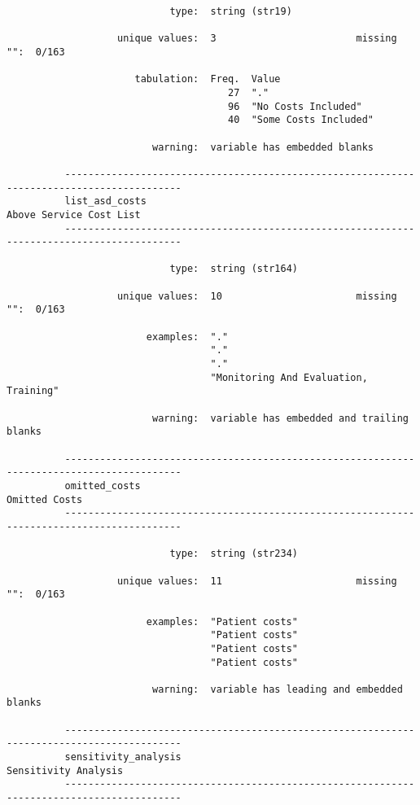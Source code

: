 \documentclass{article}
\begin{document}
\begin{verbatim}
                            type:  string (str19)
          
                   unique values:  3                        missing "":  0/163
          
                      tabulation:  Freq.  Value
                                      27  "."
                                      96  "No Costs Included"
                                      40  "Some Costs Included"
          
                         warning:  variable has embedded blanks
          
          ------------------------------------------------------------------------------------------
          list_asd_costs                                                     Above Service Cost List
          ------------------------------------------------------------------------------------------
          
                            type:  string (str164)
          
                   unique values:  10                       missing "":  0/163
          
                        examples:  "."
                                   "."
                                   "."
                                   "Monitoring And Evaluation, Training"
          
                         warning:  variable has embedded and trailing blanks
          
          ------------------------------------------------------------------------------------------
          omitted_costs                                                                Omitted Costs
          ------------------------------------------------------------------------------------------
          
                            type:  string (str234)
          
                   unique values:  11                       missing "":  0/163
          
                        examples:  "Patient costs"
                                   "Patient costs"
                                   "Patient costs"
                                   "Patient costs"
          
                         warning:  variable has leading and embedded blanks
          
          ------------------------------------------------------------------------------------------
          sensitivity_analysis                                                  Sensitivity Analysis
          ------------------------------------------------------------------------------------------
          

\end{verbatim}
\end{document}
